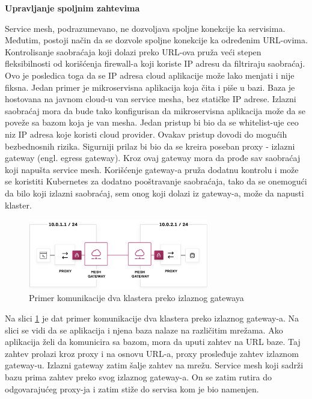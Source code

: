 \documentclass[a4paper,12pt]{report}
\begin{document}
\textbf{Upravljanje spoljnim zahtevima}\newline

Service mesh, podrazumevano, ne dozvoljava spoljne konekcije ka servisima. Međutim, postoji način da se dozvole spoljne konekcije ka određenim URL-ovima. Kontrolisanje saobraćaja koji dolazi preko URL-ova pruža veći stepen fleksibilnosti od korišćenja firewall-a koji koriste IP adresu da filtriraju saobraćaj. Ovo je posledica toga da se IP adresa cloud aplikacije može lako menjati i nije fiksna. Jedan primer je mikroservisna aplikacija koja čita i piše u bazi. Baza je hostovana na javnom cloud-u van service mesha, bez statičke IP adrese. Izlazni saobraćaj mora da bude tako konfigurisan da mikroservisna aplikacija može da se poveže sa bazom koja je van mesha. Jedan pristup bi bio da se whitelist-uje ceo niz IP adresa koje koristi cloud provider. Ovakav pristup dovodi do mogućih bezbednosnih rizika. Sigurniji prilaz bi bio da se kreira poseban proxy - izlazni gateway (engl. egress gateway). Kroz ovaj gateway mora da prođe sav saobraćaj koji napušta service mesh. Korišćenje gateway-a pruža dodatnu kontrolu i može se koristiti Kubernetes za dodatno pooštravanje saobraćaja, tako da se onemogući da bilo koji izlazni saobraćaj, sem onog koji dolazi iz gateway-a, može da napusti klaster. \newline

\begin{figure}[h]
    \centering
    \includegraphics[width=0.7\textwidth]{egress_gateway_example}
    \caption{Primer komunikacije dva klastera preko izlaznog gatewaya}
    \label{fig:egress-gateway-example}
\end{figure} 

Na slici \ref{fig:egress-gateway-example} je dat primer komunikacije dva klastera preko izlaznog gateway-a. Na slici se vidi da se  aplikacija i njena baza nalaze na različitim mrežama. Ako aplikacija želi da komunicira sa bazom, mora da uputi zahtev na URL baze. Taj zahtev prolazi kroz proxy i na osnovu URL-a, proxy prosleđuje zahtev izlaznom gateway-u. Izlazni gateway zatim šalje zahtev na mrežu. Service mesh koji sadrži bazu prima zahtev preko svog izlaznog gateway-a. On se zatim rutira do odgovarajućeg proxy-ja i zatim stiže do servisa kom je bio namenjen. \newline
\end{document}
